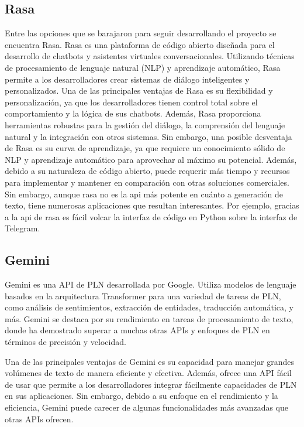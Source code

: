 \subsection{Rasa}
Entre las opciones que se barajaron para seguir desarrollando el proyecto se encuentra Rasa. Rasa es una plataforma de código abierto diseñada para el desarrollo de chatbots y asistentes virtuales conversacionales. Utilizando técnicas de procesamiento de lenguaje natural (NLP) y aprendizaje automático, Rasa permite a los desarrolladores crear sistemas de diálogo inteligentes y personalizados. Una de las principales ventajas de Rasa es su flexibilidad y personalización, ya que los desarrolladores tienen control total sobre el comportamiento y la lógica de sus chatbots. Además, Rasa proporciona herramientas robustas para la gestión del diálogo, la comprensión del lenguaje natural y la integración con otros sistemas. Sin embargo, una posible desventaja de Rasa es su curva de aprendizaje, ya que requiere un conocimiento sólido de NLP y aprendizaje automático para aprovechar al máximo su potencial. Además, debido a su naturaleza de código abierto, puede requerir más tiempo y recursos para implementar y mantener en comparación con otras soluciones comerciales. Sin embargo, aunque rasa no es la api más potente en cuánto a generación de texto, tiene numerosas aplicaciones que resultan interesantes. Por ejemplo, gracias a la api de rasa es fácil volcar la interfaz de código en Python sobre la interfaz de Telegram. 

\subsection{Gemini}


Gemini es una API de PLN desarrollada por Google. Utiliza modelos de lenguaje basados en la arquitectura Transformer para una variedad de tareas de PLN, como análisis de sentimientos, extracción de entidades, traducción automática, y más. Gemini se destaca por su rendimiento en tareas de procesamiento de texto, donde ha demostrado superar a muchas otras APIs y enfoques de PLN en términos de precisión y velocidad.

Una de las principales ventajas de Gemini es su capacidad para manejar grandes volúmenes de texto de manera eficiente y efectiva. Además, ofrece una API fácil de usar que permite a los desarrolladores integrar fácilmente capacidades de PLN en sus aplicaciones. Sin embargo, debido a su enfoque en el rendimiento y la eficiencia, Gemini puede carecer de algunas funcionalidades más avanzadas que otras APIs ofrecen.

